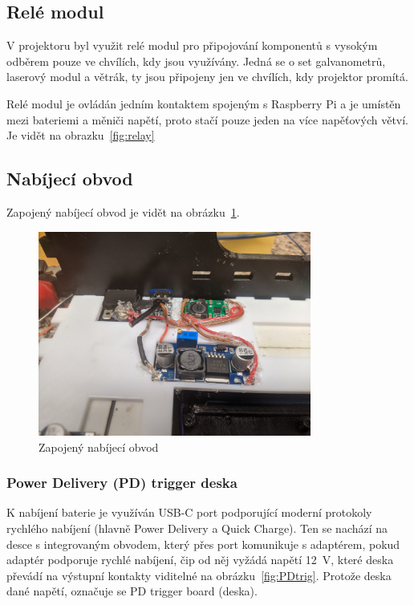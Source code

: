 \subsection{Relé modul}
V projektoru byl využit relé modul pro připojování komponentů s vysokým odběrem pouze ve chvílích, kdy jsou využívány. Jedná se o set galvanometrů, laserový modul a větrák, ty jsou připojeny jen ve chvílích, kdy projektor promítá.

Relé modul je ovládán jedním kontaktem spojeným s Raspberry Pi a je umístěn mezi bateriemi a měniči napětí, proto stačí pouze jeden na více napěťových větví. Je vidět na obrazku~\ref{fig:relay}

\subsection{Nabíjecí obvod}
Zapojený nabíjecí obvod je vidět na obrázku~\ref{fig:hw_charging_circuit}.

\begin{figure}[htb]
  \centering
  \includegraphics[width=0.8\textwidth]{img/hw_charging_circuit.jpg}
  \caption{\label{fig:hw_charging_circuit} Zapojený nabíjecí obvod}
\end{figure}

\subsubsection{Power Delivery (PD) trigger deska}
K nabíjení baterie je využíván USB-C port podporující moderní protokoly rychlého nabíjení (hlavně Power Delivery a Quick Charge). Ten se nachází na desce s integrovaným obvodem, který přes port komunikuje s adaptérem, pokud adaptér podporuje rychlé nabíjení, čip od něj vyžádá napětí 12~V, které deska převádí na výstupní kontakty viditelné na obrázku~\ref{fig:PDtrig}. Protože deska  dané napětí, označuje se PD trigger board (deska).


